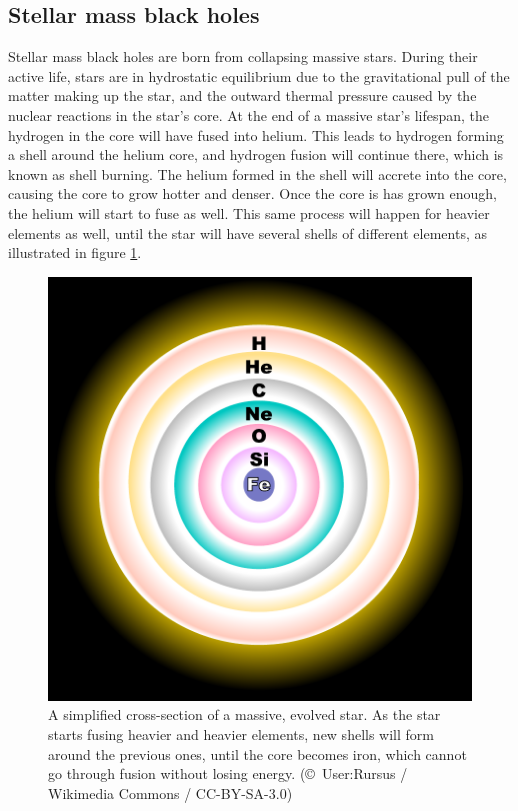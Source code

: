 \documentclass[english, oneside]{HYgradu}
\begin{document}

\subsection{Stellar mass black holes} \label{sect:stellarholes}

Stellar mass black holes are born from collapsing massive stars. During their active life, stars are in hydrostatic equilibrium due to the gravitational pull of the matter making up the star, and the outward thermal pressure caused by the nuclear reactions in the star's core. At the end of a massive star's lifespan, the hydrogen in the core will have fused into helium. This leads to hydrogen forming a shell around the helium core, and hydrogen fusion will continue there, which is known as shell burning. The helium formed in the shell will accrete into the core, causing the core to grow hotter and denser. Once the core is has grown enough, the helium will start to fuse as well. This same process will happen for heavier elements as well, until the star will have several shells of different elements, as illustrated in figure \ref{fig:FusionShells}.

\begin{figure}[h!tb]
\centering
\includegraphics[width=\textwidth]{../images/FusionShells.pdf}
\caption{A simplified cross-section of a massive, evolved star. As the star starts fusing heavier and heavier elements, new shells will form around the previous ones, until the core becomes iron, which cannot go through fusion without losing energy.
(\copyright \ User:Rursus / Wikimedia Commons / CC-BY-SA-3.0)}
\label{fig:FusionShells}
\end{figure}
\end{document}

